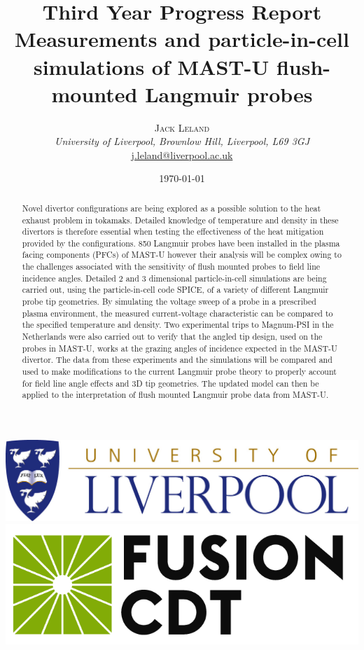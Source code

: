 \documentclass[a4paper, 12pt]{article} %
\title{\textbf{Third Year Progress Report} \\
		Measurements and particle-in-cell simulations of MAST-U flush-mounted Langmuir probes} %
\author{\textsc{Jack Leland} %
	\\ {\textit{University of Liverpool, Brownlow Hill, Liverpool, L69 3GJ}}
	\\ \href{mailto:j.leland@liverpool.ac.uk}{j.leland@liverpool.ac.uk}
	} %
\date{\today} %
\makeatletter
\renewcommand{\maketitle}{ %
\begin{minipage}{0.3\linewidth}
	\begin{flushleft}
		\vspace{-12ex}
		\hspace{-17pt}\includegraphics[width=1\linewidth]{Logos/Liverpool.jpg} \\
		\vspace{10pt}
		\hspace{-20pt}\includegraphics[width=1\linewidth]{Logos/cdt_logo_text_black.png} \\
		
		
		\vfill
	\end{flushleft}
\end{minipage}
\hfill
\begin{minipage}{0.65\linewidth}
	\begin{flushright} %
		\vspace{-5ex}
		{\LARGE\@title} %
		
		\vspace{10pt} %
		
		{\large\@author} %
		
		\vspace{20pt}
		\@date %
		
	\end{flushright}
\end{minipage}
\vspace{15pt} %
}
\makeatother
\begin{document}
\maketitle %
\thispagestyle{plain}



\begin{abstract}
Novel divertor configurations are being explored as a possible solution to the heat exhaust problem in tokamaks.
Detailed knowledge of temperature and density in these divertors is therefore essential when testing the effectiveness of the heat mitigation provided by the configurations.
850 Langmuir probes have been installed in the plasma facing components (PFCs) of MAST-U however their analysis will be complex owing to the challenges associated with the sensitivity of flush mounted probes to field line incidence angles. 
Detailed 2 and 3 dimensional particle-in-cell simulations are being carried out, using the particle-in-cell code SPICE, of a variety of different Langmuir probe tip geometries.
By simulating the voltage sweep of a probe in a prescribed plasma environment, the measured current-voltage characteristic can be compared to the specified temperature and density. 
Two experimental trips to Magnum-PSI in the Netherlands were also carried out to verify that the angled tip design, used on the probes in MAST-U, works at the grazing angles of incidence expected in the MAST-U divertor. 
The data from these experiments and the simulations will be compared and used to make modifications to the current Langmuir probe theory to properly account for field line angle effects and 3D tip geometries.
The updated model can then be applied to the interpretation of flush mounted Langmuir probe data from MAST-U.
 
\end{abstract}



\end{document}
